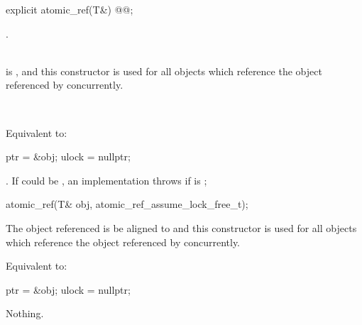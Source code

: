 \begin{itemdecl}
explicit atomic_ref(T&) @@;
\end{itemdecl}

\begin{itemdescr}
\pnum
{}.
\begin{addedblock}
\expects \\
 is , and this constructor is used for all  objects which 
reference the object referenced by  concurrently.
\end{addedblock}

\pnum
\effects {}\\
\begin{addedblock}Equivalent to:
\begin{codeblock}
  ptr = &obj;
  ulock = nullptr;
\end{codeblock}
\end{addedblock}

\pnum
\throws {}
\begin{addedblock}
\impdefx{}.  If  could be , an implementation
throws  if  is ;
\end{addedblock}
\end{itemdescr}

\begin{addedblock}
\begin{itemdecl}
atomic_ref(T& obj, atomic_ref_assume_lock_free_t);
\end{itemdecl}

\begin{itemdescr}
\pnum
\expects The object referenced  is be aligned to  and
this constructor is used for all  objects which reference the 
object referenced by  concurrently. 

\pnum
\effects Equivalent to:
\begin{codeblock}
  ptr = &obj;
  ulock = nullptr;
\end{codeblock}

\pnum
\throws Nothing.
\end{itemdescr}

\end{addedblock}


